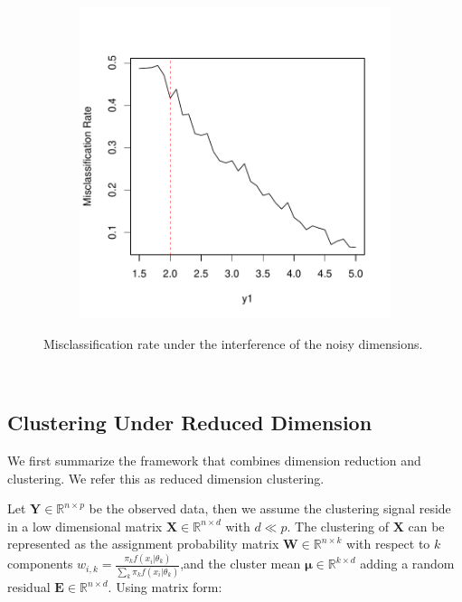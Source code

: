 \documentclass[12pt]{article}
\newcommand{\leo}[1]{{\color{blue}{\it leo: #1}}}
\newcommand{\bb}[1]{\mathbb{#1}}
\newcommand{\bl}{\boldsymbol}
\begin{document}
\begin{figure}[H]
 \centering
  \begin{subfigure}[b]{.45\textwidth}
 \includegraphics[width=1\textwidth]{pics/misrate}
\label{fig:simRepulY}
\end{subfigure}
\caption{Misclassification rate under the interference of the noisy dimensions.}
\label{fig:hd_cluster}
 \end{figure}

\leo{extend to any metric?}
\\
\leo{input on simulation conditions?}

\subsection{Clustering Under Reduced Dimension}

We first summarize the framework that combines dimension reduction and clustering. We refer this as reduced dimension clustering.

Let $\bl Y\in \bb R^{n\times p}$ be the observed data, then we assume the clustering signal reside in a low dimensional matrix $\bl X \in \bb R^{n\times d}$ with $d\ll p$. The clustering of $\bl X$ can be represented as the assignment probability matrix $\bl W\in \bb R^{n\times k}$ with respect to $k$ components $w_{i,k}= \frac {\pi_k f(x_i|\theta_k)}{\sum_k \pi_k  f(x_i|\theta_k)}$,and the cluster mean $\bl \mu \in \bb R^{k\times d}$ adding a random residual $\bl E \in \bb R^{n\times d}$. Using matrix form:
\end{document}

